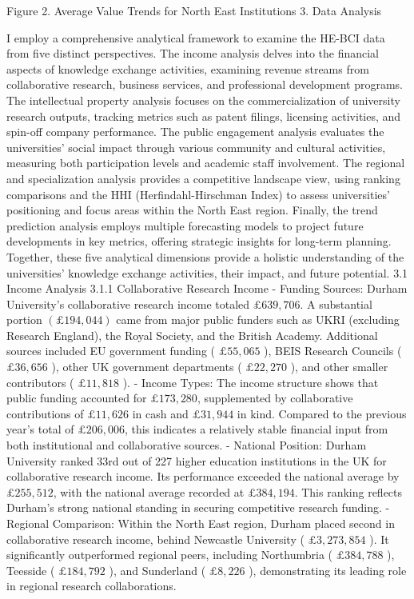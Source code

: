 Figure 2. Average Value Trends for North East Institutions
3. Data Analysis

I employ a comprehensive analytical framework to examine the HE-BCI data from five distinct perspectives. The income analysis delves into the financial aspects of knowledge exchange activities, examining revenue streams from collaborative research, business services, and professional development programs. The intellectual property analysis focuses on the commercialization of university research outputs, tracking metrics such as patent filings, licensing activities, and spin-off company performance. The public engagement analysis evaluates the universities' social impact through various community and cultural activities, measuring both participation levels and academic staff involvement. The regional and specialization analysis provides a competitive landscape view, using ranking comparisons and the HHI (Herfindahl-Hirschman Index) to assess universities' positioning and focus areas within the North East region. Finally, the trend prediction analysis employs multiple forecasting models to project future developments in key metrics, offering strategic insights for long-term planning. Together, these five analytical dimensions provide a holistic understanding of the universities' knowledge exchange activities, their impact, and future potential.
3.1 Income Analysis
3.1.1 Collaborative Research Income
- Funding Sources: Durham University's collaborative research income totaled $£ 639,706$. A substantial portion $(£ 194,044)$ came from major public funders such as UKRI (excluding Research England), the Royal Society, and the British Academy. Additional sources included EU government funding ( $£ 55,065$ ), BEIS Research Councils ( $£ 36,656$ ), other UK government departments ( $£ 22,270$ ), and other smaller contributors ( $£ 11,818$ ).
- Income Types: The income structure shows that public funding accounted for $£ 173,280$, supplemented by collaborative contributions of $£ 11,626$ in cash and $£ 31,944$ in kind. Compared to the previous year's total of $£ 206,006$, this indicates a relatively stable financial input from both institutional and collaborative sources.
- National Position: Durham University ranked 33rd out of 227 higher education institutions in the UK for collaborative research income. Its performance exceeded the national average by $£ 255,512$, with the national average recorded at $£ 384,194$. This ranking reflects Durham's strong national standing in securing competitive research funding.
- Regional Comparison: Within the North East region, Durham placed second in collaborative research income, behind Newcastle University ( $£ 3,273,854$ ). It significantly outperformed regional peers, including Northumbria ( $£ 384,788$ ), Teesside ( $£ 184,792$ ), and Sunderland ( $£ 8,226$ ), demonstrating its leading role in regional research collaborations.

